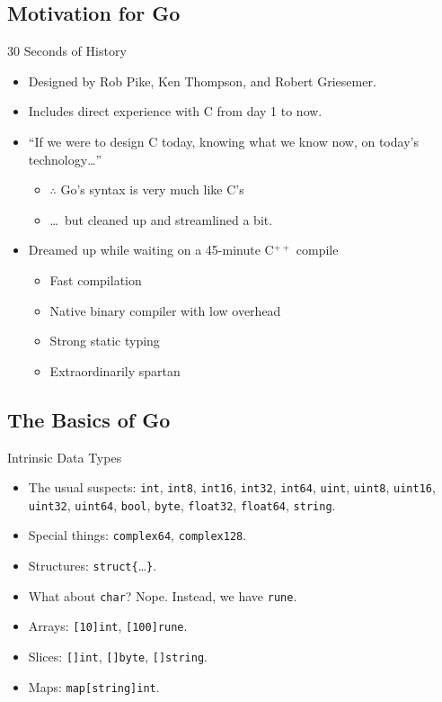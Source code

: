 \documentclass[pdf]{beamer}
\newcommand\z[1]{\texttt{#1}}
\newcommand\keyword[1]{{\color{blue}\z{#1}}}
\begin{document}
\subsection{Motivation for Go}
\begin{frame}{30 Seconds of History}
	\begin{itemize}
		\item Designed by Rob Pike, Ken Thompson, and Robert Griesemer.
		\item Includes direct experience with C from day 1 to now.
			\pause
		\item ``If we were to design C today, knowing what we know now, on today's technology\dots''
			\pause
			\begin{itemize}
		\item $\therefore$ Go's syntax is very much like C's
		\item \dots\ but cleaned up and streamlined a bit.
			\end{itemize}
		\pause
	\item Dreamed up while waiting on a 45-minute C$^{++}$ compile
		\pause
			\begin{itemize}
				\item Fast compilation
				\item Native binary compiler with low overhead
				\item Strong static typing
				\item Extraordinarily spartan
			\end{itemize}
	\end{itemize}
\end{frame}
\subsection{The Basics of Go}
\begin{frame}{Intrinsic Data Types}
	\begin{itemize}
		\item The usual suspects: 
			\keyword{int}, 
			\keyword{int8}, 
			\keyword{int16}, 
			\keyword{int32}, 
			\keyword{int64}, 
			\keyword{uint}, 
			\keyword{uint8}, 
			\keyword{uint16}, 
			\keyword{uint32}, 
			\keyword{uint64}, 
			\keyword{bool},
			\keyword{byte},
			\keyword{float32},
			\keyword{float64},
			\keyword{string}.
			\pause
		\item Special things:
			\keyword{complex64},
			\keyword{complex128}.
			\pause
		\item Structures: \keyword{struct}\z{\{}\dots\z{\}}.
			\pause
		\item What about \keyword{char}? Nope. Instead, we have \keyword{rune}.
			\pause
		\item Arrays: \z{[10]}\keyword{int}, \z{[100]}\keyword{rune}.
			\pause
		\item Slices: \z{[]}\keyword{int}, \z{[]}\keyword{byte}, \z{[]}\keyword{string}.
		\item Maps: \keyword{map}\z{[}\keyword{string}\z{]}\keyword{int}.
	\end{itemize}
\end{frame}
\end{document}
